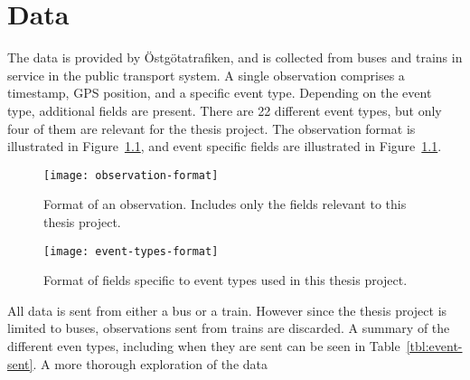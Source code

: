 \chapter{Data}\label{ch:data}
The data is provided by Östgötatrafiken, and is collected from buses
and trains in service in the public transport system.
A single observation comprises a timestamp, GPS position, and a
specific event type. Depending on the event type,
additional fields are present. There are 22 different event types,
but only four of them are relevant for the thesis project.
The observation format is illustrated in 
Figure~\ref{fig:example-observation}, and event specific fields are
illustrated in Figure~\ref{fig:example-observation}.
\begin{figure}
  \centering
  \texttt{[image: observation-format]}
  \caption{Format of an observation. Includes only the
    fields relevant to this thesis project.}\label{fig:example-observation}
\end{figure}

\begin{figure}
  \centering
  \texttt{[image: event-types-format]}
  \caption{Format of fields specific to event types used in this
    thesis project.}\label{fig:event-types-format}
\end{figure}
All data is sent from either a bus or a train. However since the thesis
project is limited to buses, observations sent from trains are
discarded. A summary of the different even types, including when they
are sent can be seen in Table~\ref{tbl:event-sent}. A more thorough
exploration of the data 

\begin{table}
  \centering
  \caption{Summary of the event types used in the thesis project.}\label{tbl:event-sent}
\end{table}

